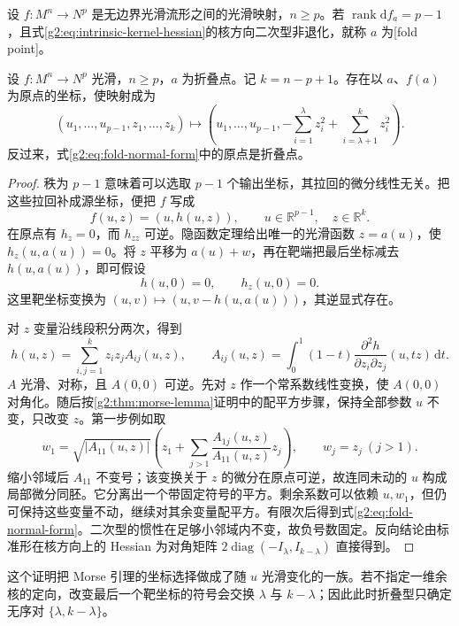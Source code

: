 \begin{definition}\label{g2:def:fold-point}
	设 \(f:M^n\to N^p\) 是无边界光滑流形之间的光滑映射，\(n\ge p\)。若 \(\operatorname{rank}\mathrm df_a=p-1\)，且式\eqref{g2:eq:intrinsic-kernel-hessian}的核方向二次型非退化，就称 \(a\) 为[fold point]。
\end{definition}

\begin{theorem}[折叠标准形]\label{g2:thm:fold-normal-form}
	设 \(f:M^n\to N^p\) 光滑，\(n\ge p\)，\(a\) 为折叠点。记 \(k=n-p+1\)。存在以 \(a\)、\(f(a)\) 为原点的坐标，使映射成为
	\begin{equation}\label{g2:eq:fold-normal-form}
		(u_1,\ldots,u_{p-1},z_1,\ldots,z_k)
		\longmapsto\left(u_1,\ldots,u_{p-1},-\sum_{i=1}^{\lambda}z_i^2+\sum_{i=\lambda+1}^{k}z_i^2\right).
	\end{equation}
	反过来，式\eqref{g2:eq:fold-normal-form}中的原点是折叠点。
\end{theorem}
\begin{proof}
	秩为 \(p-1\) 意味着可以选取 \(p-1\) 个输出坐标，其拉回的微分线性无关。把这些拉回补成源坐标，便把 \(f\) 写成
	\[
		f(u,z)=(u,h(u,z)),\qquad u\in\mathbb R^{p-1},\quad z\in\mathbb R^k.
	\]
	在原点有 \(h_z=0\)，而 \(h_{zz}\) 可逆。隐函数定理给出唯一的光滑函数 \(z=a(u)\)，使 \(h_z(u,a(u))=0\)。将 \(z\) 平移为 \(a(u)+w\)，再在靶端把最后坐标减去 \(h(u,a(u))\)，即可假设
	\[
		h(u,0)=0,\qquad h_z(u,0)=0.
	\]
	这里靶坐标变换为 \((u,v)\mapsto(u,v-h(u,a(u)))\)，其逆显式存在。

	对 \(z\) 变量沿线段积分两次，得到
	\[
		h(u,z)=\sum_{i,j=1}^k z_i z_j A_{ij}(u,z),\qquad
		A_{ij}(u,z)=\int_0^1(1-t)\frac{\partial^2h}{\partial z_i\partial z_j}(u,tz)\,\mathrm dt.
	\]
	\(A\) 光滑、对称，且 \(A(0,0)\) 可逆。先对 \(z\) 作一个常系数线性变换，使 \(A(0,0)\) 对角化。随后按\cref{g2:thm:morse-lemma}证明中的配平方步骤，保持全部参数 \(u\) 不变，只改变 \(z\)。第一步例如取
	\[
		w_1=\sqrt{|A_{11}(u,z)|}\left(z_1+\sum_{j>1}\frac{A_{1j}(u,z)}{A_{11}(u,z)}z_j\right),\qquad w_j=z_j\ (j>1).
	\]
	缩小邻域后 \(A_{11}\) 不变号；该变换关于 \(z\) 的微分在原点可逆，故连同未动的 \(u\) 构成局部微分同胚。它分离出一个带固定符号的平方。剩余系数可以依赖 \(u,w_1\)，但仍可保持这些变量不动，继续对其余变量配平方。有限次后得到式\eqref{g2:eq:fold-normal-form}。二次型的惯性在足够小邻域内不变，故负号数固定。反向结论由标准形在核方向上的 Hessian 为对角矩阵 \(2\operatorname{diag}(-I_\lambda,I_{k-\lambda})\) 直接得到。
\end{proof}

这个证明把 Morse 引理的坐标选择做成了随 \(u\) 光滑变化的一族。若不指定一维余核的定向，改变最后一个靶坐标的符号会交换 \(\lambda\) 与 \(k-\lambda\)；因此此时折叠型只确定无序对 \(\{\lambda,k-\lambda\}\)。

